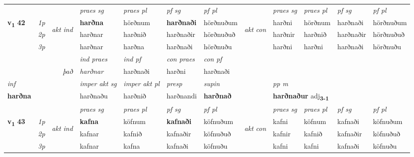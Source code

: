 \begin{longtable}[l]{X>{\footnotesize\itshape}llXXXXlXXXX}
 & &   & \textit{praes sg}  & \textit{praes pl}    & \textit{ pf sg} & \textit{pf pl} & & \textit{praes sg}  & \textit{praes pl}    & \textit{pf sg} & \textit{pf pl }  \\ \cmidrule{4-7} \cmidrule{9-12}
 \multirow{2}{*}{{{\textbf{v{\textsubscript{1}}} \Large{\textbf{42}}}}}  & 1p & \multirow{3}{*}{\begin{turn}{90}\textit{akt ind}\end{turn}} & \textbf{harðna} & hörðnum & \textbf{harðnaði} & hörðnuðum & \multirow{3}{*}{\begin{turn}{90}\textit{akt con}\end{turn}} &harðni & hörðnum & harðnaði & hörðnuðum\\*
 & 2p &  &  harðnar  & harðnið & harðnaðir & hörðnuðuð & & harðnir & harðnið & harðnaðir & hörðnuðuð \\*
 & 3p &  & harðnar & harðna & harðnaði & hörðnuðu & & harðni & harðni& harðnaði & hörðnuðu \\*
\cmidrule{4-7} \cmidrule{9-12}

   && &  \textit{ind praes} & \textit{ind pf} & \textit{con praes} & \textit{con pf} \\*
\multicolumn{3}{r}{\textit{það}} & harðnar & harðnaði & harðni & harðnaði \\*

\cmidrule{4-7}
   {\textit{inf}} & &  & \textit{imper akt sg} & \textit{imper akt pl}   & \textit{presp} & \textit{supin}  && \textit{pp m} \\*
  {\textbf{harðna}} & && harðnaðu  & harðnið   & harðnandi &  \textbf{harðnað}  && \multicolumn{2}{l}{\textbf{harðnaður} adj\textbf{\textsubscript{3-1}}} \\*

\midrule

 & &   & \textit{praes sg}  & \textit{praes pl}    & \textit{ pf sg} & \textit{pf pl} & & \textit{praes sg}  & \textit{praes pl}    & \textit{pf sg} & \textit{pf pl }  \\ \cmidrule{4-7} \cmidrule{9-12}
 \multirow{2}{*}{{{\textbf{v{\textsubscript{1}}} \Large{\textbf{43}}}}}  & 1p & \multirow{3}{*}{\begin{turn}{90}\textit{akt ind}\end{turn}} & \textbf{kafna} & köfnum & \textbf{kafnaði} & köfnuðum & \multirow{3}{*}{\begin{turn}{90}\textit{akt con}\end{turn}} &kafni & köfnum & kafnaði & köfnuðum\\*
 & 2p &  &  kafnar  & kafnið & kafnaðir & köfnuðuð & & kafnir & kafnið & kafnaðir & köfnuðuð \\*
 & 3p &  & kafnar & kafna & kafnaði & köfnuðu & & kafni & kafni& kafnaði & köfnuðu \\*
\cmidrule{4-7} \cmidrule{9-12}


\end{longtable}
